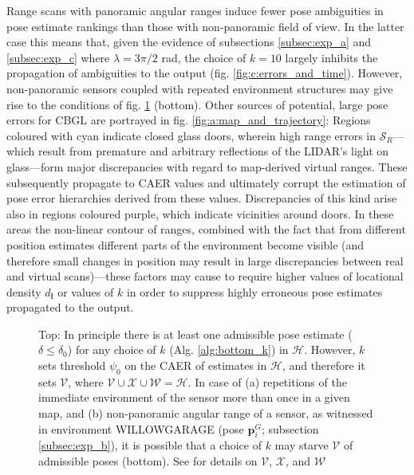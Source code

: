 Range scans with panoramic angular ranges induce fewer pose ambiguities in pose
estimate rankings than those with non-panoramic field of view. In the latter
case this means that, given the evidence of subsections \ref{subsec:exp_a} and
\ref{subsec:exp_c} where $\lambda = 3\pi/2$ rad, the choice of $k=10$ largely
inhibits the propagation of ambiguities to the output (fig.
\ref{fig:c:errors_and_time}).  However, non-panoramic sensors coupled with
repeated environment structures may give rise to the conditions of fig.
\ref{fig:h_and_h_not_fig} (bottom). Other sources of potential, large pose
errors for CBGL are portrayed in fig. \ref{fig:a:map_and_trajectory}:
Regions coloured with cyan indicate closed glass doors, wherein high range
errors in $\mathcal{S}_R$---which result from premature and arbitrary
reflections of the LIDAR's light on glass---form major discrepancies with
regard to map-derived virtual ranges. These subsequently propagate to CAER
values and ultimately corrupt the estimation of pose error hierarchies derived
from these values.  Discrepancies of this kind arise also in regions coloured
purple, which indicate vicinities around doors. In these areas the non-linear
contour of ranges, combined with the fact that from different position
estimates different parts of the environment become visible (and therefore
small changes in position may result in large discrepancies between real and
virtual scans)---these factors may cause to require higher values of locational
density $d_{\bm{l}}$ or values of $k$ in order to suppress highly erroneous
pose estimates propagated to the output.

\begin{figure}
  
  \vspace{0.3cm}
  \caption{\small Top: In principle there is at least one admissible pose
           estimate ($\delta \leq \delta_0$) for any choice of $k$ (Alg.
           \ref{alg:bottom_k}) in $\mathcal{H}$. However, $k$ sets threshold
           $\psi_0$ on the CAER of estimates in $\mathcal{H}$, and therefore it
           sets $\mathcal{V}$, where $\mathcal{V} \cup \mathcal{X} \cup
           \mathcal{W} = \mathcal{H}$. In case of (a) repetitions of the
           immediate environment of the sensor more than once in a given map,
           and (b) non-panoramic angular range of a sensor, as witnessed in
           environment WILLOWGARAGE (pose $\bm{p}_{i}^G$; subsection
           \ref{subsec:exp_b}), it is possible that a choice of $k$ may starve
           $\mathcal{V}$ of admissible poses (bottom). See \cite{cbglarxiv} for
           details on $\mathcal{V}$, $\mathcal{X}$, and $\mathcal{W}$
        }
        \vspace{-0.5cm}
  \label{fig:h_and_h_not_fig}
\end{figure}
